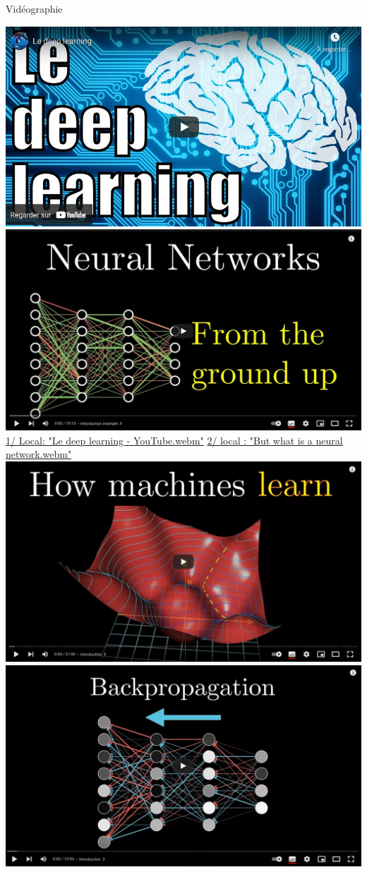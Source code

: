\documentclass[10pt,serif,mathserif,compress,hyperref={colorlinks}]{beamer}
\begin{document}
\begin{frame}{Vidéographie}

  \hspace*{-3mm}
  \href{https://youtu.be/trWrEWfhTVg}{\includegraphics[width=.5\textwidth]{images/video-LeDeepLearning.png}}
  \hfill%
  \href{https://www.3blue1brown.com/lessons/neural-networks}{\includegraphics[width=.5\textwidth]{images/video-NeuralNetworks.png}}\\[-2mm]

  {\tiny\hspace*{-2mm}\href{run:./videos/Le deep learning - YouTube.webm}{1/ Local: "Le deep learning - YouTube.webm"}%
    \hfill%
    \href{run:./videos/But what is a neural network.webm}{2/ local : "But what is a neural network.webm"}}\\[2mm]
            
  \hspace*{-3mm}
  \href{https://www.3blue1brown.com/lessons/gradient-descent}{\includegraphics[width=.5\textwidth]{images/video-HowMachineLearn.png}}
  \hfill
  \href{https://www.3blue1brown.com/lessons/backpropagation}{\includegraphics[width=.5\textwidth]{images/video-BackPropagation.png}}\\[-2mm]
  

\end{frame}
\end{document}
